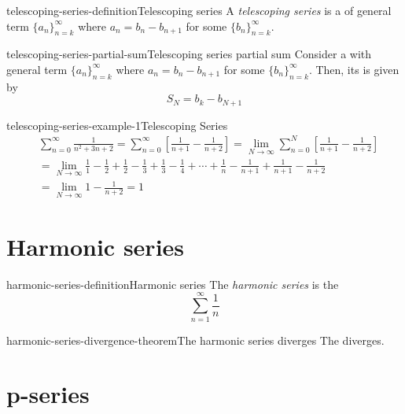 \documentclass[preview]{standalone}
\begin{document}
\begin{snippetdefinition}{telescoping-series-definition}{Telescoping series}
    A \textit{telescoping series} is a \series of general term \(\{a_n\}_{n=k}^\infty\)
    where \(a_n = b_n - b_{n+1}\) for some \sequence \(\{b_n\}_{n=k}^\infty\).
\end{snippetdefinition}

\begin{snippetproposition}{telescoping-series-partial-sum}{Telescoping series partial sum}
    Consider a \telescopicseries with general term \(\{a_n\}_{n=k}^\infty\)
    where \(a_n = b_n - b_{n+1}\) for some \sequence \(\{b_n\}_{n=k}^\infty\).
    Then, its \partialsum is given by
    \[ S_N = b_k - b_{N+1} \]
\end{snippetproposition}

\begin{snippetexample}{telescoping-series-example-1}{Telescoping Series}
    \begin{align*}
        &\sum_{n=0}^\infty \frac{1}{n^2 + 3n + 2}
        = \sum_{n=0}^\infty \left[ \frac{1}{n+1} - \frac{1}{n+2} \right]
        = \lim_{N \to \infty} \sum_{n=0}^N \left[ \frac{1}{n+1} - \frac{1}{n+2} \right] \\
        &= \lim_{N \to \infty} \frac{1}{1} - \frac{1}{2} + \frac{1}{2} - \frac{1}{3}
        + \frac{1}{3} - \frac{1}{4} + \cdots + \frac{1}{n} - \frac{1}{n+1} +
        \frac{1}{n+1} - \frac{1}{n+2} \\
        &= \lim_{N \to \infty} 1 - \frac{1}{n+2} = 1
    \end{align*}
\end{snippetexample}

\section{Harmonic series}

\begin{snippetdefinition}{harmonic-series-definition}{Harmonic series}
    The \textit{harmonic series} is the \series
    \[
        \sum_{n=1}^\infty \frac{1}{n}
    \]
\end{snippetdefinition}

\begin{snippettheorem}{harmonic-series-divergence-theorem}{The harmonic series diverges}
    The \harmonicseries diverges.
\end{snippettheorem}

\section{p-series}
\end{document}

